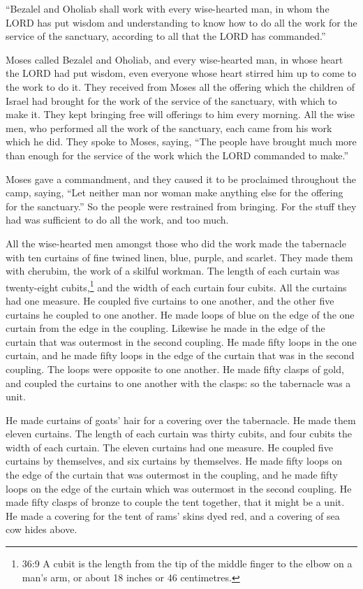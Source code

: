  ``Bezalel and Oholiab shall work with every wise-hearted
man, in whom the LORD has put wisdom and understanding to know how to do
all the work for the service of the sanctuary, according to all that the
LORD has commanded.''

 Moses called Bezalel and Oholiab, and every wise-hearted
man, in whose heart the LORD had put wisdom, even everyone whose heart
stirred him up to come to the work to do it.  They received
from Moses all the offering which the children of Israel had brought for
the work of the service of the sanctuary, with which to make it. They
kept bringing free will offerings to him every morning.  All
the wise men, who performed all the work of the sanctuary, each came
from his work which he did.  They spoke to Moses, saying,
``The people have brought much more than enough for the service of the
work which the LORD commanded to make.''

 Moses gave a commandment, and they caused it to be
proclaimed throughout the camp, saying, ``Let neither man nor woman make
anything else for the offering for the sanctuary.'' So the people were
restrained from bringing.  For the stuff they had was
sufficient to do all the work, and too much.

 All the wise-hearted men amongst those who did the work
made the tabernacle with ten curtains of fine twined linen, blue,
purple, and scarlet. They made them with cherubim, the work of a skilful
workman.  The length of each curtain was twenty-eight
cubits,\footnote{36:9 A cubit is the length from the tip of the middle
  finger to the elbow on a man's arm, or about 18 inches or 46
  centimetres.} and the width of each curtain four cubits. All the
curtains had one measure.  He coupled five curtains to one
another, and the other five curtains he coupled to one another.
 He made loops of blue on the edge of the one curtain from
the edge in the coupling. Likewise he made in the edge of the curtain
that was outermost in the second coupling.  He made fifty
loops in the one curtain, and he made fifty loops in the edge of the
curtain that was in the second coupling. The loops were opposite to one
another.  He made fifty clasps of gold, and coupled the
curtains to one another with the clasps: so the tabernacle was a unit.

 He made curtains of goats' hair for a covering over the
tabernacle. He made them eleven curtains.  The length of
each curtain was thirty cubits, and four cubits the width of each
curtain. The eleven curtains had one measure.  He coupled
five curtains by themselves, and six curtains by themselves.
 He made fifty loops on the edge of the curtain that was
outermost in the coupling, and he made fifty loops on the edge of the
curtain which was outermost in the second coupling.  He
made fifty clasps of bronze to couple the tent together, that it might
be a unit.  He made a covering for the tent of rams' skins
dyed red, and a covering of sea cow hides above.

